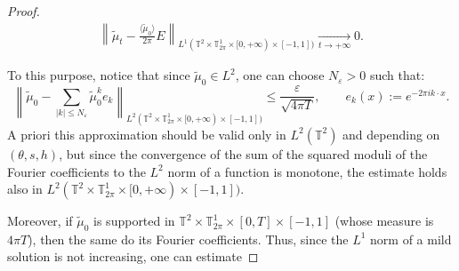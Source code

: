 \documentclass[a4paper,10pt,reqno]{amsart}
\numberwithin{equation}{subsection}
\numberwithin{figure}{subsection}
\begin{document}
\begin{proof}
\begin{align}\label{convergenzanormaL1}
\left\|\tilde\mu_t-\frac{\langle\tilde\mu_0\rangle}{2\pi}E\right\|_{L^1(\mathbb{T}^2\times\mathbb{T}^1_{2\pi}\times[0,+\infty)\times[-1,1])}\xrightarrow[t\to+\infty]{}0.
\end{align}

To this purpose, notice that since $\tilde\mu_0\in L^2$, one can choose $N_{\varepsilon}>0$ such that:
\[
\left\|\tilde\mu_0-\sum_{|k|\leq N_{\varepsilon}}\tilde\mu_0^ke_k\right\|_{L^2(\mathbb{T}^2\times\mathbb{T}^1_{2\pi}\times[0,+\infty)\times[-1,1])}\leq\frac{\varepsilon}{\sqrt{4\pi T}},\qquad e_k(x):=e^{-2\pi ik\cdot x}.
\]
A priori this approximation should be valid only in $L^2(\mathbb{T}^2)$ and depending on $(\theta,s,h)$, but since the convergence of the sum of the squared moduli of the Fourier coefficients to the $L^2$ norm of a function is monotone, the estimate holds also in $L^2(\mathbb{T}^2\times\mathbb{T}^1_{2\pi}\times[0,+\infty)\times[-1,1])$.

Moreover, if $\tilde\mu_0$ is supported in $\mathbb{T}^2\times\mathbb{T}^1_{2\pi}\times[0,T]\times[-1,1]$ (whose measure is $4\pi T$), then the same do its Fourier coefficients. Thus, since the $L^1$ norm of a mild solution is not increasing, one can estimate


\end{proof}
\end{document}
